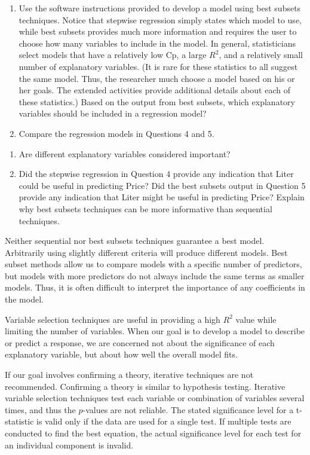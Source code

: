 \documentclass[
]{report}
\begin{document}
\begin{enumerate}
\def\labelenumi{\arabic{enumi}.}
\setcounter{enumi}{4}
\item
  Use the software instructions provided to develop a model using best subsets techniques. Notice that stepwise regression simply states which model to use, while best subsets provides much more information and requires the user to choose how many variables to include in the model. In general, statisticians select models that have a relatively low Cp, a large \(R^2\), and a relatively small number of explanatory variables. (It is rare for these statistics to all suggest the same model. Thus, the researcher much choose a model based on his or her goals. The extended activities provide additional details
  about each of these statistics.) Based on the output from best subsets, which explanatory variables should be included in a regression model?
\item
  Compare the regression models in Questions 4 and 5.
\end{enumerate}

\begin{enumerate}
\def\labelenumi{\alph{enumi}.}
\item
  Are different explanatory variables considered important?
\item
  Did the stepwise regression in Question 4 provide any indication that Liter could be useful in predicting Price? Did the best subsets output in Question 5 provide any indication that Liter might be useful in predicting Price? Explain why best subsets techniques can be more informative than sequential techniques.
\end{enumerate}

Neither sequential nor best subsets techniques guarantee a best model. Arbitrarily using slightly different criteria will produce different models. Best subset methods allow us to compare models with a specific number of predictors, but models with more predictors do not always include the same terms as smaller models. Thus, it is often difficult to interpret the importance of any coefficients in the model.

Variable selection techniques are useful in providing a high \(R^2\) value while limiting the number of variables. When our goal is to develop a model to describe or predict a response, we are concerned not about the significance of each explanatory variable, but about how well the overall model fits.

If our goal involves confirming a theory, iterative techniques are not recommended. Confirming a theory is similar to hypothesis testing. Iterative variable selection techniques test each variable or combination of variables several times, and thus the \(p\)-values are not reliable. The stated significance level for a t-statistic is valid only if the data are used for a single test. If multiple tests are conducted to find the best equation, the actual significance level for each test for an individual component is invalid.
\end{document}
